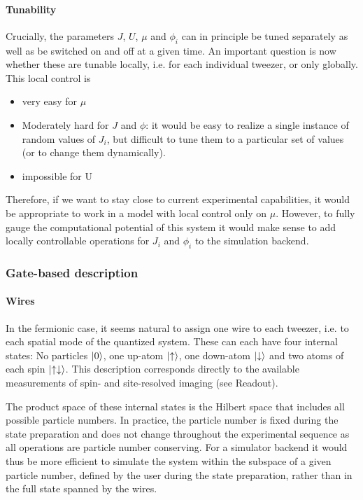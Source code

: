 \documentclass[a4paper, 10pt]{article}
\begin{document}
\paragraph{Tunability} Crucially, the parameters $J$, $U$, $\mu$ and $\phi_i$ can in principle be tuned separately as well as be switched on and off at a given time. 
An important question is now whether these are tunable locally, i.e. for each individual tweezer, or only globally. This local control is

    \begin{itemize}
        \item very easy for $\mu$
        \item Moderately hard for $J$ and $\phi$: it would be easy to realize a single instance of random values of $J_i$, but difficult to tune them to a particular set of values (or to change them dynamically).
        \item impossible for U
    \end{itemize}

    Therefore, if we want to stay close to current experimental capabilities, it would be appropriate to work in a model with local control only on $\mu$.
    However, to fully gauge the computational potential of this system it would make sense to add locally controllable operations for $J_i$ and $\phi_i$ to the simulation backend.

    \subsubsection{Gate-based description}
    
    \paragraph{Wires}
    In the fermionic case, it seems natural to assign one wire to each tweezer, i.e. to each spatial mode of the quantized system.
    These can each have four internal states: No particles $\ket{0}$, one up-atom $\ket{\uparrow}$, one down-atom $\ket{\downarrow}$ and two atoms of each spin $\ket{\uparrow \downarrow}$.
    This description corresponds directly to the available measurements of spin- and site-resolved imaging (see Readout).
    
    The product space of these internal states is the Hilbert space that includes all possible particle numbers.
    In practice, the particle number is fixed during the state preparation and does not change throughout the experimental sequence as all operations are particle number conserving.
    For a simulator backend it would thus be more efficient to simulate the system within the subspace of a given particle number, defined by the user during the state preparation, rather than in the full state spanned by the wires.
\end{document}
